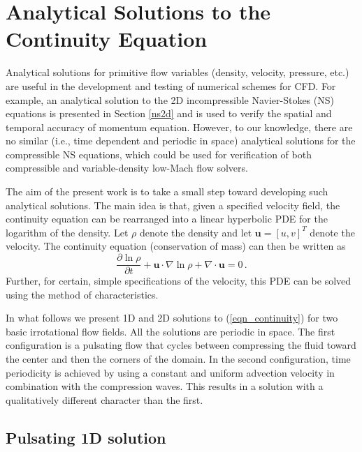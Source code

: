 \documentclass[11pt]{book}
\begin{document}
\clearpage

\section{Analytical Solutions to the Continuity Equation}

Analytical solutions for primitive flow variables (density, velocity, pressure, etc.) are useful in the development and testing of numerical schemes for CFD.  For example, an analytical solution to the 2D incompressible Navier-Stokes (NS) equations is presented in Section \ref{ns2d} and is used to verify the spatial and temporal accuracy of momentum equation.  However, to our knowledge, there are no similar (i.e., time dependent and periodic in space) analytical solutions for the compressible NS equations, which could be used for verification of both compressible and variable-density low-Mach flow solvers.

The aim of the present work is to take a small step toward developing such analytical solutions.  The main idea is that, given a specified velocity field, the continuity equation can be rearranged into a linear hyperbolic PDE for the logarithm of the density.  Let $\rho$ denote the density and let $\mathbf{u} = [u,v]^T$ denote the velocity. The continuity equation (conservation of mass) can then be written as
\begin{equation}
\label{eqn_continuity}
\frac{\partial \ln \rho}{\partial t} + \mathbf{u} \cdot \nabla \ln \rho + \nabla\cdot \mathbf{u} = 0 \,\mbox{.}
\end{equation}
Further, for certain, simple specifications of the velocity, this PDE can be solved using the method of characteristics.

In what follows we present 1D and 2D solutions to (\ref{eqn_continuity}) for two basic irrotational flow fields.  All the solutions are periodic in space.  The first configuration is a pulsating flow that cycles between compressing the fluid toward the center and then the corners of the domain.  In the second configuration, time periodicity is achieved by using a constant and uniform advection velocity in combination with the compression waves.  This results in a solution with a qualitatively different character than the first.

\subsection{Pulsating 1D solution}
\label{soln_1d}
\end{document}
